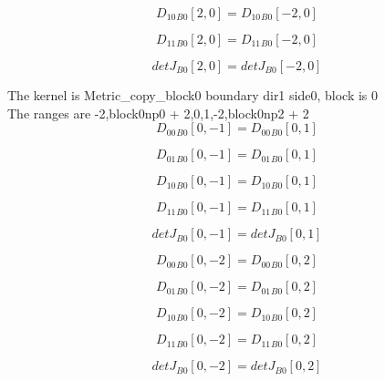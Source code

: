 \documentclass{article}
\begin{document}
\begin{dmath}{D_{10}{_{B0}}}[{2,0}] = {D_{10}{_{B0}}}[{-2,0}]\end{dmath}

\begin{dmath}{D_{11}{_{B0}}}[{2,0}] = {D_{11}{_{B0}}}[{-2,0}]\end{dmath}

\begin{dmath}{detJ{_{B0}}}[{2,0}] = {detJ{_{B0}}}[{-2,0}]\end{dmath}

\noindent The kernel is Metric_copy_block0 boundary dir1 side0, block is 0\\\noindent The ranges are -2,block0np0 + 2,0,1,-2,block0np2 + 2\\\begin{dmath}{D_{00}{_{B0}}}[{0,-1}] = {D_{00}{_{B0}}}[{0,1}]\end{dmath}

\begin{dmath}{D_{01}{_{B0}}}[{0,-1}] = {D_{01}{_{B0}}}[{0,1}]\end{dmath}

\begin{dmath}{D_{10}{_{B0}}}[{0,-1}] = {D_{10}{_{B0}}}[{0,1}]\end{dmath}

\begin{dmath}{D_{11}{_{B0}}}[{0,-1}] = {D_{11}{_{B0}}}[{0,1}]\end{dmath}

\begin{dmath}{detJ{_{B0}}}[{0,-1}] = {detJ{_{B0}}}[{0,1}]\end{dmath}

\begin{dmath}{D_{00}{_{B0}}}[{0,-2}] = {D_{00}{_{B0}}}[{0,2}]\end{dmath}

\begin{dmath}{D_{01}{_{B0}}}[{0,-2}] = {D_{01}{_{B0}}}[{0,2}]\end{dmath}

\begin{dmath}{D_{10}{_{B0}}}[{0,-2}] = {D_{10}{_{B0}}}[{0,2}]\end{dmath}

\begin{dmath}{D_{11}{_{B0}}}[{0,-2}] = {D_{11}{_{B0}}}[{0,2}]\end{dmath}

\begin{dmath}{detJ{_{B0}}}[{0,-2}] = {detJ{_{B0}}}[{0,2}]\end{dmath}
\end{document}
